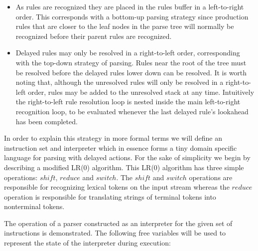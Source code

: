 \documentclass[envcountsame,runningheads]{llncs}
\begin{document}
\begin{itemize}
\item As rules are recognized they are placed in the rules buffer in a left-to-right order. 
This corresponds with a bottom-up parsing strategy since production rules that are closer to the leaf nodes in the parse tree will normally be recognized before their parent rules are recognized.
\item Delayed rules may only be resolved in a right-to-left order, corresponding with the top-down strategy of parsing. Rules near the root of the tree must be resolved before 
the delayed rules lower down can be resolved. 
It is worth noting that, although the unresolved rules will only be resolved in a right-to-left order, rules may be added to the unresolved stack at any time.
Intuitively the right-to-left rule resolution loop is nested inside the main left-to-right recognition loop, to be evaluated whenever the last delayed rule's lookahead has been completed.
\end{itemize}

In order to explain this strategy in more formal terms we will define an instruction set and interpreter which in essence forms a tiny domain specific language for parsing with delayed actions.
For the sake of simplicity we begin by describing a modified LR(0) algorithm. This LR(0) algorithm has three simple operations: $shi\!ft$, $reduce$ and $switch$. 
The $shi\!ft$ and $switch$ operations are responsible for recognizing lexical tokens on the input stream whereas the $reduce$ operation is responsible for translating strings of terminal tokens into nonterminal tokens.

The operation of a parser constructed as an interpreter for the given set of instructions is demonstrated.
The following free variables will be used to represent the state of the interpreter during execution:
\end{document}

